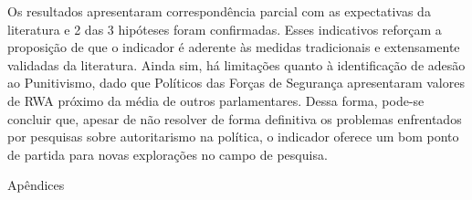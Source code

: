 \documentclass[
12pt,				%
openright,			%
twoside,			%
a4paper,			%
english,			%
french,				%
spanish,			%
brazil				%
]{abntex2}
\begin{document}
Os resultados apresentaram correspondência parcial com as expectativas da literatura e 2 das 3 hipóteses foram confirmadas. Esses indicativos reforçam a proposição de que o indicador é aderente às medidas tradicionais e extensamente validadas da literatura. Ainda sim, há limitações quanto à identificação de adesão ao Punitivismo, dado que Políticos das Forças de Segurança apresentaram valores de RWA próximo da média de outros parlamentares. Dessa forma, pode-se concluir que, apesar de não resolver de forma definitiva os problemas enfrentados por pesquisas sobre autoritarismo na política, o indicador oferece um bom ponto de partida para novas explorações no campo de pesquisa.


\postextual



%
%


Apêndices

\printindex
\end{document}
